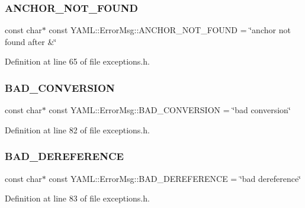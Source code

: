 \subsubsection{\texorpdfstring{ANCHOR\_NOT\_FOUND}{ANCHOR\_NOT\_FOUND}}
{\footnotesize\ttfamily const char$\ast$ const Y\+A\+M\+L\+::\+Error\+Msg\+::\+A\+N\+C\+H\+O\+R\+\_\+\+N\+O\+T\+\_\+\+F\+O\+U\+ND = \char`\"{}anchor not found after \&\char`\"{}}



Definition at line 65 of file exceptions.\+h.

\mbox{\label{namespace_y_a_m_l_1_1_error_msg_a720cf08bf5993a065fc72b16da4ed8aa}} 
\subsubsection{\texorpdfstring{BAD\_CONVERSION}{BAD\_CONVERSION}}
{\footnotesize\ttfamily const char$\ast$ const Y\+A\+M\+L\+::\+Error\+Msg\+::\+B\+A\+D\+\_\+\+C\+O\+N\+V\+E\+R\+S\+I\+ON = \char`\"{}bad conversion\char`\"{}}



Definition at line 82 of file exceptions.\+h.

\mbox{\label{namespace_y_a_m_l_1_1_error_msg_a9a6b8dedbdae4130488ffddd02db26e7}} 
\subsubsection{\texorpdfstring{BAD\_DEREFERENCE}{BAD\_DEREFERENCE}}
{\footnotesize\ttfamily const char$\ast$ const Y\+A\+M\+L\+::\+Error\+Msg\+::\+B\+A\+D\+\_\+\+D\+E\+R\+E\+F\+E\+R\+E\+N\+CE = \char`\"{}bad dereference\char`\"{}}



Definition at line 83 of file exceptions.\+h.

\mbox{\label{namespace_y_a_m_l_1_1_error_msg_acb86302be9624ebd956e3cd514e41fb2}} 
